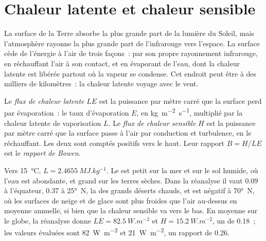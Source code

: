 \section{Chaleur latente et chaleur sensible}\label{sec:b1:radiation-heat-transport:latent}

La surface de la Terre absorbe la plus grande part de la lumière du Soleil, mais l'atmosphère rayonne
la plus grande part de l'infrarouge vers l'espace. La surface cède de l'énergie à l'air de trois façons~:
par son propre rayonnement infrarouge, en réchauffant l'air à son contact, et en
évaporant de l'eau, dont la chaleur latente est libérée partout où la vapeur se condense.
Cet endroit peut être à des milliers de kilomètres~: la chaleur latente voyage avec le
vent.

\begin{definition}\label{def:b1:radiation-heat-transport:surface-fluxes}
Le \emph{flux de chaleur latente} $LE$ est la puissance par mètre
carré que la surface perd par évaporation~: le taux d'évaporation $E$, en
\unit{kg.m^{-2}.s^{-1}}, multiplié par la chaleur latente de vaporisation $L$. Le
\emph{flux de chaleur sensible} $H$ est la puissance par mètre
carré que la surface passe à l'air par conduction et turbulence, en le
réchauffant. Les deux sont comptés positifs vers le haut. Leur rapport $B = H/LE$ est le
\emph{rapport de Bowen}.
\end{definition}

Vers \qty{15}{\celsius}, $L = \qty{2.4655}{MJ.kg^{-1}}$. Le  est petit
sur la mer et sur le sol humide, où l'eau est abondante, et grand sur les terres sèches.
Dans la réanalyse il vaut \num{0.09} à l'équateur, \num{0.37} à \ang{25}~N, la
 des grands déserts chauds, et est négatif à \ang{70}~N, où les surfaces de neige et de
glace sont plus froides que l'air au-dessus en moyenne annuelle, si bien que la
chaleur sensible va vers le bas. En moyenne sur le globe, la réanalyse donne $LE =
\qty{82.5}{W.m^{-2}}$ et $H = \qty{15.2}{W.m^{-2}}$, un  de \num{0.18}~;
les valeurs évaluées sont \qty{82}{W.m^{-2}} et \qty{21}{W.m^{-2}}, un rapport de
\num{0.26}.

